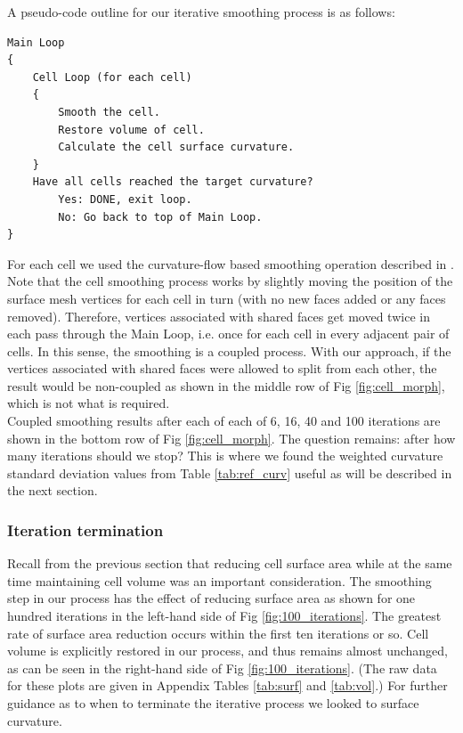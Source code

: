 \documentclass[10pt,letterpaper]{article}
\begin{document}
A pseudo-code outline for our iterative smoothing process is as follows:
\begin{verbatim}
Main Loop
{
    Cell Loop (for each cell)
    {
        Smooth the cell.
        Restore volume of cell.
        Calculate the cell surface curvature.
    }
    Have all cells reached the target curvature?
        Yes: DONE, exit loop.
        No: Go back to top of Main Loop.  
}
\end{verbatim}

For each cell we used the curvature-flow based smoothing operation described in \cite{Desbrun:1999:IFI:311535.311576}. Note that the cell smoothing process works by slightly moving the position of the surface mesh vertices for each cell in turn (with no new faces added or any faces removed). Therefore, vertices associated with shared faces get moved twice in each pass through the Main Loop, i.e. once for each cell in every adjacent pair of cells. In this sense, the smoothing is a coupled process. With our approach, if the vertices associated with shared faces were allowed to split from each other, the result would be non-coupled as shown in the middle row of Fig \ref{fig:cell_morph}, which is not what is required.\\

Coupled smoothing results after each of each of 6, 16, 40 and 100 iterations are shown in the bottom row of Fig \ref{fig:cell_morph}.
The question remains: after how many iterations should we stop? This is where we found the weighted curvature standard deviation values from Table \ref{tab:ref_curv} useful as will be described in the next section.\\

\subsubsection*{Iteration termination}

Recall from the previous section that reducing cell surface area while at the same time maintaining cell volume was an important consideration. The smoothing step in our process has the effect of reducing surface area as shown for one hundred iterations in the left-hand side of Fig \ref{fig:100_iterations}. The greatest rate of surface area reduction occurs within the first ten iterations or so. Cell volume is explicitly restored in our process, and thus remains almost unchanged, as can be seen in the right-hand side of Fig \ref{fig:100_iterations}. (The raw data for these plots are given in Appendix Tables \ref{tab:surf} and \ref{tab:vol}.) For further guidance as to when to terminate the iterative process we looked to surface curvature.\\
\end{document}
